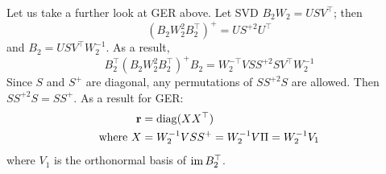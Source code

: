 \documentclass{mynotes}
\begin{document}
\begin{remark}
      Let us take a further look at GER above. Let SVD 
      \( B_2 W_2 = U S V^\top\); then 
      \begin{equation}
            \left( B_2 W_2^2 B_2^\top \right)^+ = U S^{+2} U^\top 
      \end{equation}
      and \( B_2 = U S V^\top W_2^{-1} \). As a result, 
      \begin{equation}
            B_2^\top \left( B_2 W_2^2 B_2^\top \right)^+ B_2 = W_2^{-\top} V S S^{+2} S V^\top W_2^{-1} 
      \end{equation}
      Since \( S \) and \( S^+ \) are diagonal, any permutations of \( S S^{+2} S \) are allowed. Then \( S S^{+2} S = S S^+ \). As a result for GER:  
      \begin{equation}
            \begin{aligned}
                  \mathbf{r} & = \operatorname{diag}( X X^\top ) \\
                  \text{where } X & = W_2^{-1} V S S^+ = W_2^{-1} V \Pi = W_2^{-1} V_1 
            \end{aligned}
      \end{equation}
      where \( V_1 \) is the orthonormal basis of \( \operatorname{im} B_2^\top \).
\end{remark}





\clearpage
\nocite{*}


\end{document}
